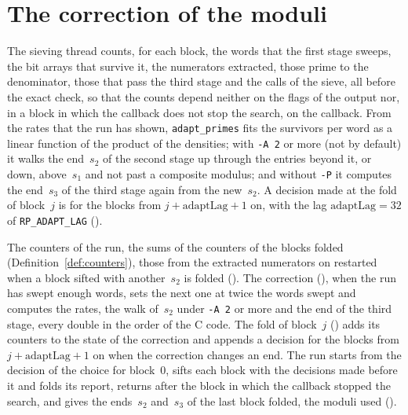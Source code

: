 \section{The correction of the moduli}\label{sec:moduliCorrection}

The sieving thread counts, for each block, the words that the first stage sweeps, the bit arrays
that survive it, the numerators extracted, those prime to the denominator, those that pass the
third stage and the calls of the sieve, all before the exact check, so that the counts depend
neither on the flags of the output nor, in a block in which the callback does not stop the search,
on the callback. From the rates that the run has shown, \verb|adapt_primes| fits the survivors per
word as a linear function of the product of the densities; with \verb|-A 2| or more (not by
default) it walks the end~$s_2$ of the second stage up through the entries beyond it, or down,
above~$s_1$ and not past a composite modulus; and without \verb|-P| it computes the end~$s_3$ of
the third stage again from the new~$s_2$. A decision made at the fold of block~$j$ is for the
blocks from $j + \mathrm{adaptLag} + 1$ on, with the lag $\mathrm{adaptLag} = 32$ of
\verb|RP_ADAPT_LAG| ().

\begin{definition}\label{def:correction}
  \leanok
  The counters of the run, the sums of the counters of the blocks folded
  (Definition~\ref{def:counters}), those from the extracted numerators on restarted when a block sifted with another~$s_2$ is folded
  (). The correction (), when
  the run has swept enough words, sets the next one at twice the words swept and computes the
  rates, the walk of~$s_2$ under \verb|-A 2| or more and the end of the third stage, every double
  in the order of the C code.
  The fold of block~$j$ () adds its counters to the state of the
  correction and appends a decision for the blocks from $j + \mathrm{adaptLag} + 1$ on when the
  correction changes an end. The run starts from the decision of the choice for
  block~$0$, sifts each block with the decisions made before it and folds its report, returns after
  the block in which the callback stopped the search, and gives the ends~$s_2$ and~$s_3$ of the
  last block folded, the moduli used ().
\end{definition}

